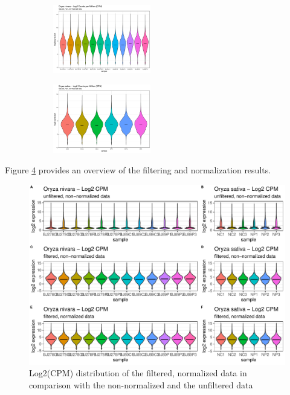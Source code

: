 \begin{figure}[htbp]
    \caption{Log2(CPM) distribution of the filtered, normalized data}
    \label{fig:2.4-Log2CPM-flt-norm}
    \begin{subfigure}[t]{0.64\linewidth}
        \caption{}
        \label{fig:2.4-Log2CPM-flt-norm-Oryza_nivara}
        \includegraphics[width=\textwidth, height=3cm]{../../results/plots-and-tables/2.3-Log2CPM-flt-notnorm-Oryza_nivara}
    \end{subfigure}
    \begin{subfigure}[t]{0.32\linewidth}
        \caption{}
        \label{fig:2.4-Log2CPM-flt-norm-Oryza_sativa}
        \includegraphics[width=\textwidth, height=3cm]{../../results/plots-and-tables/2.3-Log2CPM-flt-notnorm-Oryza_sativa}
    \end{subfigure}
\end{figure}

Figure \ref{fig:2.5-Log2CPM-Overview} provides an overview of the filtering and normalization results.

\begin{figure}[htbp]
    \caption{Log2(CPM) distribution of the filtered, normalized data in comparison with the non-normalized and the unfiltered data}
    \label{fig:2.5-Log2CPM-Overview}
    \includegraphics[width=\textwidth]{../../results/plots-and-tables/2.5-Log2CPM-Overview}
\end{figure}

